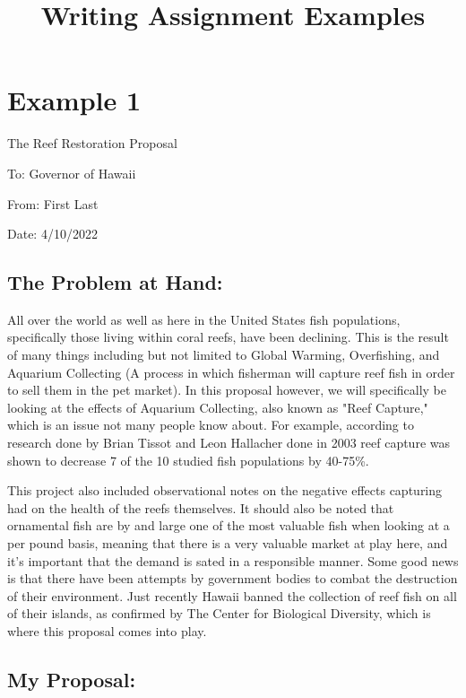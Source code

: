 \documentclass[11pt]{article}
\title{Writing Assignment Examples}
\begin{document}
\section*{Example 1}

\noindent
The Reef Restoration Proposal

\noindent
To: Governor of Hawaii

\noindent
From: First Last

\noindent
Date: 4/10/2022

\subsection*{The Problem at Hand:}

All over the world as well as here in the United States fish populations, specifically those living within coral reefs, have been declining. This is the result of many things including but not limited to Global Warming, Overfishing, and Aquarium Collecting (A process in which fisherman will capture reef fish in order to sell them in the pet market). In this proposal however, we will specifically be looking at the effects of Aquarium Collecting, also known as "Reef Capture," which is an issue not many people know about. For example, according to research done by Brian Tissot and Leon Hallacher done in 2003 reef capture was shown to decrease 7 of the 10 studied fish populations by 40-75\%.

This project also included observational notes on the negative effects capturing had on the health of the reefs themselves. It should also be noted that ornamental fish are by and large one of the most valuable fish when looking at a per pound basis, meaning that there is a very valuable market at play here, and it's important that the demand is sated in a responsible manner. Some good news is that there have been attempts by government bodies to combat the destruction of their environment. Just recently Hawaii banned the collection of reef fish on all of their islands, as confirmed by The Center for Biological Diversity, which is where this proposal comes into play.

\subsection*{My Proposal:}
\end{document}
